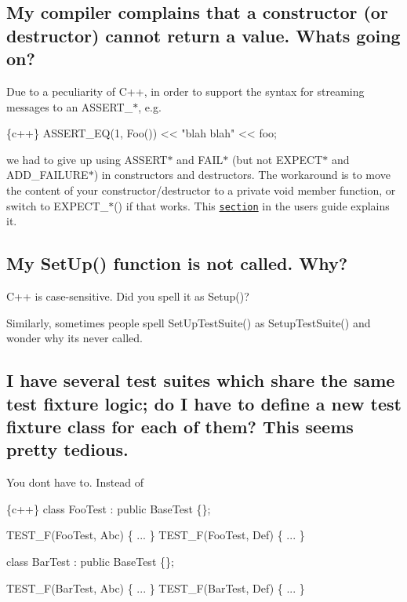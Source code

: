 \subsection*{My compiler complains that a constructor (or destructor) cannot return a value. What\textquotesingle{}s going on?}

Due to a peculiarity of C++, in order to support the syntax for streaming messages to an {\ttfamily A\+S\+S\+E\+R\+T\+\_\+$\ast$}, e.\+g.


\begin{DoxyCode}
\{c++\}
  ASSERT\_EQ(1, Foo()) << "blah blah" << foo;
\end{DoxyCode}


we had to give up using {\ttfamily A\+S\+S\+E\+R\+T$\ast$} and {\ttfamily F\+A\+I\+L$\ast$} (but not {\ttfamily E\+X\+P\+E\+C\+T$\ast$} and {\ttfamily A\+D\+D\+\_\+\+F\+A\+I\+L\+U\+R\+E$\ast$}) in constructors and destructors. The workaround is to move the content of your constructor/destructor to a private void member function, or switch to {\ttfamily E\+X\+P\+E\+C\+T\+\_\+$\ast$()} if that works. This \href{advanced.md#assertion-placement}{\tt section} in the user\textquotesingle{}s guide explains it.

\subsection*{My Set\+Up() function is not called. Why?}

C++ is case-\/sensitive. Did you spell it as {\ttfamily Setup()}?

Similarly, sometimes people spell {\ttfamily Set\+Up\+Test\+Suite()} as {\ttfamily Setup\+Test\+Suite()} and wonder why it\textquotesingle{}s never called.

\subsection*{I have several test suites which share the same test fixture logic; do I have to define a new test fixture class for each of them? This seems pretty tedious.}

You don\textquotesingle{}t have to. Instead of


\begin{DoxyCode}
\{c++\}
class FooTest : public BaseTest \{\};

TEST\_F(FooTest, Abc) \{ ... \}
TEST\_F(FooTest, Def) \{ ... \}

class BarTest : public BaseTest \{\};

TEST\_F(BarTest, Abc) \{ ... \}
TEST\_F(BarTest, Def) \{ ... \}
\end{DoxyCode}


